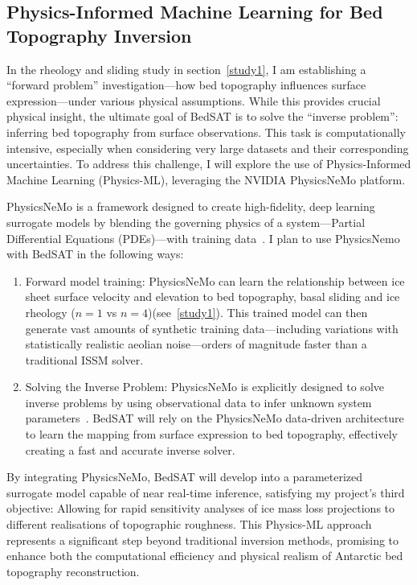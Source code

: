 \subsection{Physics-Informed Machine Learning for Bed Topography Inversion}\label{ML}
In the rheology and sliding study in section~\ref{study1}, I am establishing a ``forward problem'' investigation—how bed topography influences surface expression—under various physical assumptions. While this provides crucial physical insight, the ultimate goal of BedSAT is to solve the ``inverse problem'': inferring bed topography from surface observations. This task is computationally intensive, especially when considering very large datasets and their corresponding uncertainties. To address this challenge, I will explore the use of Physics-Informed Machine Learning (Physics-ML), leveraging the NVIDIA PhysicsNeMo platform.

PhysicsNeMo is a framework designed to create high-fidelity, deep learning surrogate models by blending the governing physics of a system—Partial Differential Equations (PDEs)—with training data~\cite{NVIDIA_NeMo_2025}. I plan to use PhysicsNemo with BedSAT in the following ways: 

\begin{enumerate}
\item{Forward model training}: PhysicsNeMo can learn the relationship between ice sheet surface velocity and elevation to bed topography, basal sliding and ice rheology ($n=1$ vs $n=4$)(see~\ref{study1}). This trained model can then generate vast amounts of synthetic training data—including variations with statistically realistic aeolian noise—orders of magnitude faster than a traditional ISSM solver.

\item{Solving the Inverse Problem}: PhysicsNeMo is explicitly designed to solve inverse problems by using observational data to infer unknown system parameters~\cite{NVIDIA_NeMo_2025}. BedSAT will rely on the PhysicsNeMo data-driven architecture to learn the mapping from surface expression to bed topography, effectively creating a fast and accurate inverse solver.
\end{enumerate}

By integrating PhysicsNeMo, BedSAT will develop into a parameterized surrogate model capable of near real-time inference, satisfying my project's third objective: Allowing for rapid sensitivity analyses of ice mass loss projections to different realisations of topographic roughness. This Physics-ML approach represents a significant step beyond traditional inversion methods, promising to enhance both the computational efficiency and physical realism of Antarctic bed topography reconstruction.
